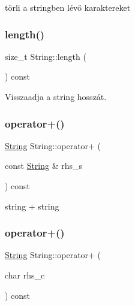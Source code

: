 törli a stringben lévő karaktereket 

\mbox{\label{class_string_ad3b888edbfb3bab21d4bae4663d2211a}} 
\subsubsection{\texorpdfstring{length()}{length()}}
{\footnotesize\ttfamily size\+\_\+t String\+::length (\begin{DoxyParamCaption}{ }\end{DoxyParamCaption}) const\hspace{0.3cm}{\ttfamily [inline]}}



Visszaadja a string hosszát. 

\mbox{\label{class_string_a28a020f061e5f25317af47488bfb7de8}} 
\subsubsection{\texorpdfstring{operator+()}{operator+()}\hspace{0.1cm}{\footnotesize\ttfamily [1/2]}}
{\footnotesize\ttfamily \mbox{\hyperlink{class_string}{String}} String\+::operator+ (\begin{DoxyParamCaption}\item[{const \mbox{\hyperlink{class_string}{String}} \&}]{rhs\+\_\+s }\end{DoxyParamCaption}) const}



string + string 

\mbox{\label{class_string_abb187e5ab66fe29c42aed4845b55dd76}} 
\subsubsection{\texorpdfstring{operator+()}{operator+()}\hspace{0.1cm}{\footnotesize\ttfamily [2/2]}}
{\footnotesize\ttfamily \mbox{\hyperlink{class_string}{String}} String\+::operator+ (\begin{DoxyParamCaption}\item[{char}]{rhs\+\_\+c }\end{DoxyParamCaption}) const\hspace{0.3cm}{\ttfamily [inline]}}



